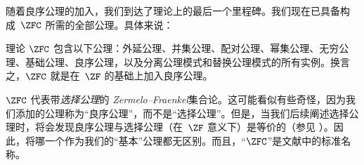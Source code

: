 \documentclass[../../../include/open-logic-section]{subfiles}
\begin{document}

随着良序公理的加入，我们到达了理论上的最后一个里程碑。我们现在已具备构成~$\ZFC$ 所需的全部公理。具体来说：

\begin{defn}
理论 $\ZFC$ 包含以下公理：外延公理、并集公理、配对公理、幂集公理、无穷公理、基础公理、良序公理，以及分离公理模式和替换公理模式的所有实例。换言之，$\ZFC$ 就是在~$\ZF$ 的基础上加入良序公理。
\end{defn}

$\ZFC$ 代表带\emph{选择公理}的 \emph{Zermelo--Fraenkel}集合论。这可能看似有些奇怪，因为我们添加的公理称为“良序公理”，而不是“选择公理”。但是，当我们后续阐述选择公理时，将会发现良序公理与选择公理（在~$\ZF$ 意义下）是等价的（参见 ）。因此，将哪一个作为我们的“基本”公理都无区别。而且，“$\ZFC$”是文献中的标准名称。
\end{document}
